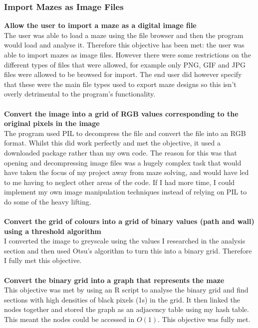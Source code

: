 \documentclass[titlepage]{article}
\begin{document}
\subsubsection{Import Mazes as Image Files}
\textbf{Allow the user to import a maze as a digital image file}\\
The user was able to load a maze using the file browser and then the program would load and analyse it. Therefore this objective has been met: the user was able to import mazes as image files. However there were some restrictions on the different types of files that were allowed, for example only PNG, GIF and JPG files were allowed to be browsed for import. The end user did however specify that these were the main file types used to export maze designs so this isn't overly detrimental to the program's functionality.\\\\
\textbf{Convert the image into a grid of RGB values corresponding to the original pixels in the image}\\
The program used PIL to decompress the file and convert the file into an RGB format. Whilst this did work perfectly and met the objective, it used a downloaded package rather than my own code. The reason for this was that opening and decompressing image files was a hugely complex task that would have taken the focus of my project away from maze solving, and would have led to me having to neglect other areas of the code. If I had more time, I could implement my own image manipulation techniques instead of relying on PIL to do some of the heavy lifting.\\\\
\textbf{Convert the grid of colours into a grid of binary values (path and wall) using a threshold algorithm}\\
I converted the image to greyscale using the values I researched in the analysis section and then used Otsu's algorithm to turn this into a binary grid. Therefore I fully met this objective.\\\\
\textbf{Convert the binary grid into a graph that represents the maze}\\
This objective was met by using an R script to analyse the binary grid and find sections with high densities of black pixels (1s) in the grid. It then linked the nodes together and stored the graph as an adjacency table using my hash table. This meant the nodes could be accessed in $O(1)$. This objective was fully met.\\\\
\end{document}
